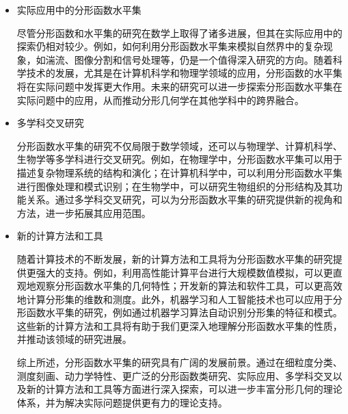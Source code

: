 \begin{itemize}
\item 实际应用中的分形函数水平集

尽管分形函数和水平集的研究在数学上取得了诸多进展，但其在实际应用中的探索仍相对较少。例如，如何利用分形函数水平集来模拟自然界中的复杂现象，如湍流、图像分割和信号处理等，仍是一个值得深入研究的方向。随着科学技术的发展，尤其是在计算机科学和物理学领域的应用，分形函数的水平集将在实际问题中发挥更大作用。未来的研究可以进一步探索分形函数水平集在实际问题中的应用，从而推动分形几何学在其他学科中的跨界融合。

\item 多学科交叉研究

分形函数水平集的研究不仅局限于数学领域，还可以与物理学、计算机科学、生物学等多学科进行交叉研究。例如，在物理学中，分形函数水平集可以用于描述复杂物理系统的结构和演化；在计算机科学中，可以利用分形函数水平集进行图像处理和模式识别；在生物学中，可以研究生物组织的分形结构及其功能关系。通过多学科交叉研究，可以为分形函数水平集的研究提供新的视角和方法，进一步拓展其应用范围。

\item 新的计算方法和工具

随着计算技术的不断发展，新的计算方法和工具将为分形函数水平集的研究提供更强大的支持。例如，利用高性能计算平台进行大规模数值模拟，可以更直观地观察分形函数水平集的几何特性；开发新的算法和软件工具，可以更高效地计算分形集的维数和测度。此外，机器学习和人工智能技术也可以应用于分形函数水平集的研究，例如通过机器学习算法自动识别分形集的特征和模式。这些新的计算方法和工具将有助于我们更深入地理解分形函数水平集的性质，并推动该领域的研究进展。

综上所述，分形函数水平集的研究具有广阔的发展前景。通过在细粒度分类、测度刻画、动力学特性、更广泛的分形函数类研究、实际应用、多学科交叉以及新的计算方法和工具等方面进行深入探索，可以进一步丰富分形几何的理论体系，并为解决实际问题提供更有力的理论支持。
\end{itemize}
\newpage
\begingroup
    \printbibliography[title={参考文献}]
\endgroup
